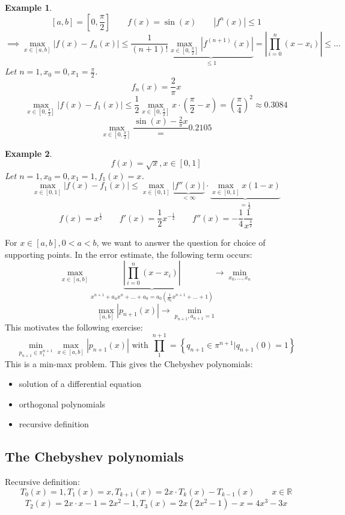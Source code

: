 \documentclass{article}
\newtheorem{example}{Example}
\newcommand{\setdef}[2]{\left\{#1|#2\right\}}
\newcommand{\card}[1]{\left|#1\right|}
\begin{document}
\begin{example}
  \[ [a,b] = [0, \frac\pi2] \qquad f(x) = \sin(x) \qquad \card{f^n(x)} \leq 1 \]
  \[ \implies \max_{x \in [a,b]} \card{f(x) - f_n(x)} \leq \frac{1}{(n+1)!} \underbrace{\max_{x \in [0, \frac\pi2]} \card{f^{(n+1)}(x)}}_{\leq 1} = \card{\prod_{i=0}^n (x - x_i)} \leq \dots \]
  Let $n = 1, x_0 = 0, x_1 = \frac\pi2$.
  \[ f_n(x) = \frac2\pi x \]
  \[ \max_{x \in [0, \frac\pi2]} \card{f(x) - f_1(x)} \leq \frac12 \max_{x \in [0, \frac\pi2]} x \cdot (\frac\pi2 - x) = \left(\frac\pi4\right)^2 \approx 0.3084 \]
  \[ \max_{x \in [0,\frac\pi2]} \frac{\sin(x) - \frac2\pi x} = 0.2105 \]
\end{example}

\begin{example}
  \[ f(x) = \sqrt{x}, x \in [0,1] \]
  Let $n=1, x_0=0, x_1=1, f_1(x) = x$.
  \[ \max_{x \in [0,1]} \card{f(x) - f_1(x)} \leq \max_{x \in [0,1]} \underbrace{\card{f''(x)}}_{<\infty} \cdot \underbrace{\max_{x \in [0,1]} x (1 - x)}_{=\frac12} \]
  \[ f(x) = x^{\frac12} \qquad f'(x) = \frac12 x^{-\frac12} \qquad f''(x) = -\frac14 \frac{1}{x^{\frac32}} \]
\end{example}

For $x \in [a,b], 0 < a < b$, we want to answer the question for choice of supporting points. In the error estimate, the following term occurs:
\[
  \max_{x \in [a,b]} \underbrace{\card{\prod_{i=0}^n (x - x_i)}}_{x^{n+1} + a_a x^n + \dots + a_0 = a_0 (\frac1{a_0} x^{n+1} + \dots + 1)} \to \min_{x_0, \dots, x_n}
\] \[
  \max_{[a,b]} \card{p_{n+1}(x)} \to \min_{p_{n+1}, a_{n+1} = 1}
\]
This motivates the following exercise:
\[
  \min_{p_{n+1} \in \pi_1^{n+1}}
  \max_{x \in [a,b]}
  \card{p_{n+1}(x)}
  \text{ with }
  \prod_1^{n+1} = \setdef{q_{n+1} \in \pi^{n+1}}{q_{n+1}(0) = 1}
\]
This is a min-max problem. This gives the Chebyshev polynomials:
\begin{itemize}
  \item solution of a differential equation
  \item orthogonal polynomials
  \item recursive definition
\end{itemize}

\subsection{The Chebyshev polynomials}

Recursive definition:
\[ T_0(x) = 1, T_1(x) = x, T_{k+1}(x) = 2x \cdot T_k(x) - T_{k-1}(x) \qquad x \in \mathbb R \]
\[ T_2(x) = 2x \cdot x - 1 = 2x^2 - 1, T_3(x) = 2x (2x^2 - 1) - x = 4x^3 - 3x \]
\end{document}
